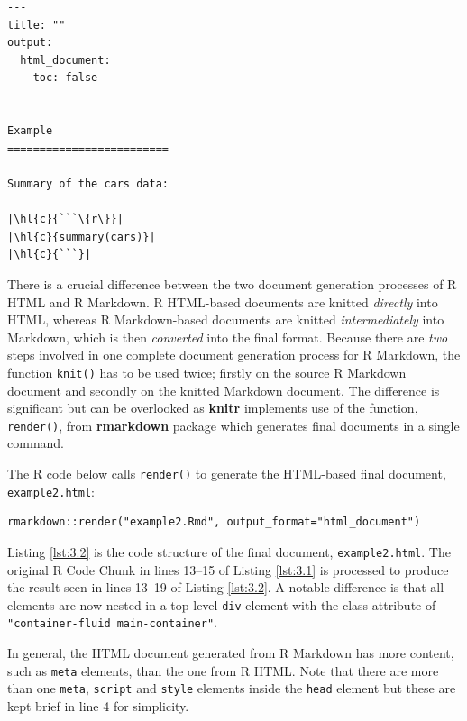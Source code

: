 \documentclass[a4paper, 12pt]{report}
\begin{document}
\begin{lstlisting}[caption={\texttt{example2.Rmd}}, escapechar=\|, label={lst:3.1}]
---
title: ""
output:
  html_document:
    toc: false
---

Example
=========================

Summary of the cars data:

|\hl{c}{```\{r\}}|
|\hl{c}{summary(cars)}|
|\hl{c}{```}|
\end{lstlisting}

There is a crucial difference between the two document generation processes of R HTML and R Markdown. R HTML-based documents are knitted \emph{directly} into HTML, whereas R Markdown-based documents are knitted \emph{intermediately} into Markdown, which is then \emph{converted} into the final format. Because there are \emph{two} steps involved in one complete document generation process for R Markdown, the function \texttt{knit()} has to be used twice; firstly on the source R Markdown document and secondly on the knitted Markdown document. The difference is significant but can be overlooked as \textbf{knitr} implements use of the function, \texttt{render()}, from \textbf{rmarkdown} \citep{rmarkdown} package which generates final documents in a single command.

The R code below calls \texttt{render()} to generate the HTML-based final document, \texttt{example2.html}:
\begin{lstlisting}[numbers=none, frame=none]
rmarkdown::render("example2.Rmd", output_format="html_document")
\end{lstlisting}

Listing \ref{lst:3.2} is the code structure of the final document, \texttt{example2.html}. The original R Code Chunk in lines 13--15 of Listing \ref{lst:3.1} is processed to produce the result seen in lines 13--19 of Listing \ref{lst:3.2}. A notable difference is that all elements are now nested in a top-level \texttt{div} element with the class attribute of \texttt{"container-fluid main-container"}.

In general, the HTML document generated from R Markdown has more content, such as \texttt{meta} elements, than the one from R HTML. Note that there are more than one \texttt{meta}, \texttt{script} and \texttt{style} elements inside the \texttt{head} element but these are kept brief in line 4 for simplicity.
\end{document}
